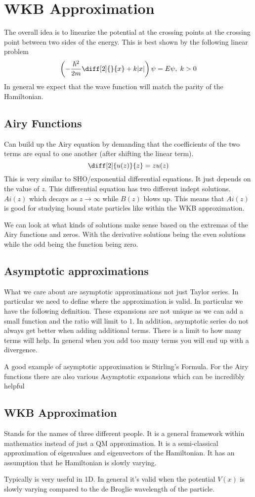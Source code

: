 \section{WKB Approximation}
The overall idea is to linearize the potential at the crossing points at the crossing
point between two sides of the energy. This is best shown by the following linear problem
$$
    \left(- \frac{\hbar^2}{2m}\diff[2]{}{x} + k \abs*{x}\right)\psi = E \psi,
    \; k>0
$$
In general we expect that the wave function will match the parity of the Hamiltonian.
\subsection{Airy Functions}
Can build up the Airy equation by demanding that the coefficients of the two terms
are equal to one another (after shifting the linear term).
$$
    \diff[2]{u(z)}{z} = z u(z)
$$
This is very similar to SHO/exponential differential equations. It just depends on the value
of $z$. This differential equation has two different indept solutions. $Ai(z)$ which decays
as $z \to \infty$ while $B(z)$ blows up. This means that $Ai(z)$ is good for studying 
bound state particles like within the WKB approximation.

We can look at what kinds of solutions make sense based on the extremas of the Airy
functions and zeros. With the derivative solutions being the even solutions while the
odd being the function being zero.

\subsection{Asymptotic approximations}
What we care about are asymptotic approximations not just Taylor series. In particular
we need to define where the approximation is valid. In particular we have the following
definition. These expansions are not unique as we can add a small function and the ratio
will limit to $1$. In addition, asymptotic series do not always get better when adding
additional terms. There is a limit to how many terms will help. In general when you add
too many terms you will end up with a divergence.

A good example of asymptotic approximation is Stirling's Formula. For the Airy functions
there are also various Asymptotic expansions which can be incredibly helpful

\subsection{WKB Approximation}
Stands for the names of three different people. It is a general framework within mathematics
instead of just a QM approximation. It is a semi-classical approximation of 
eigenvalues and eigenvectors of the Hamiltonian. It has an assumption that he Hamiltonian
is slowly varying.

Typically is very useful in 1D. In general it's valid when the potential $V(x)$ is slowly
varying compared to the de Broglie wavelength of the particle.

